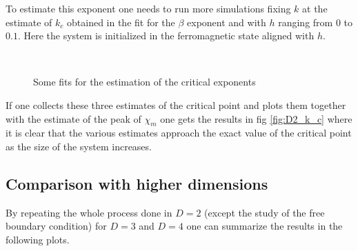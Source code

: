 \documentclass[a4paper, 11pt]{article}
\begin{document}
    To estimate this exponent one needs to run more simulations fixing $k$ at the estimate of $k_c$ obtained in the fit for the $\beta$ exponent and with $h$ ranging from $0$ to $0.1$. Here the system is initialized in the ferromagnetic state aligned with $h$.

    \begin{figure}[H]
      \centering
      \begin{subfigure}[Fit of the magnetization with respect to $k$ at $h = 0$]{
        \label{fig:D2_beta}}
      \end{subfigure}
      \begin{subfigure}[Fit of the magnetic susceptibility]{
        \label{fig:D2_gamma}}
      \end{subfigure} \\
      \begin{subfigure}[Fit of the specific heat]{
        \label{fig:D2_alpha}}
      \end{subfigure}
      \begin{subfigure}[Fit of the magnetization with respect to $h$ at $k = k_c$]{
        \label{fig:D2_delta}}
      \end{subfigure}
      \caption{Some fits for the estimation of the critical exponents}
    \end{figure}

    If one collects these three estimates of the critical point and plots them together with the estimate of the peak of $\chi_m$ one gets the results in fig \ref{fig:D2_k_c} where it is clear that the various estimates approach the exact value of the critical point as the size of the system increases.


  \subsection{Comparison with higher dimensions}
    By repeating the whole process done in $D=2$ (except the study of the free boundary condition) for $D = 3$ and $D = 4$ one can summarize the results in the following plots.
\end{document}
